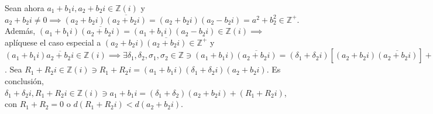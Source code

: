 \begin{teorema}[3F]
\begin{dem}
        Sean ahora $a_1+b_1i,a_2+b_2i\in\mathbb{Z}(i)$ y $a_2+b_2i\neq 0\implies (a_2+b_2i)\overline{(a_2+b_2i)}=(a_2+b_2i)(a_2-b_2i)=a^2+b_2^2\in\mathbb{Z}^+$. Además, $(a_1+b_1i)\overline{(a_2+b_2i)}= (a_1+b_1i)(a_2-b_2i)\in\mathbb{Z}(i)\implies$ aplíquese el caso especial a $(a_2+b_2i)\overline{(a_2+b_2i)}\in\mathbb{Z}^+$ y $(a_1+b_1i)\overline{a_2+b_2i}\in\mathbb{Z}(i)\implies \exists \delta_1,\delta_2,\sigma_1,\sigma_2\in\mathbb{Z}\ni (a_1+b_1i)\overline{(a_2+b_2i)}=(\delta_1+\delta_2i)\left[(a_2+b_2i)\overline{(a_2+b_2i)}\right]+ (\sigma_1+\sigma_2i)\ni d(a_2+b_2i)d(\overline{(a_2+b_2i)})=d\left((a_2+b_2i)\overline{(a_2+b_2i)}\right)>d(\sigma_1+\sigma_2i)=d\left((a_1+b_1i)\overline{(a_2+b_2i)}-(\sigma_1+\sigma_2i)\left[(a_2+b_2i)\overline{(a_2+b_2i)}\right]\right)=d\left(\left[(a_1+b_1i)-(\sigma_1+\sigma_2i)(a_2+b_2i)\overline{(a_2+b_2i)}\right]\right) = d\left((a_1+b_1i)-(\delta_1+\delta_2i)(a_2+b_2i)\right)d\left(\overline{a_2+b_2i}\right)\implies d(a_2+b_2i)>d\left((a_1+b_1i)-(\delta_1+\delta_2i)(a_2+b_2i)\right)$. Sea $R_1+R_2i\in \mathbb{Z}(i)\ni R_1+R_2i=(a_1+b_1i)(\delta_1+\delta_2i)(a_2+b_2i)$. Es conclusión, $\delta_1+\delta_2i, R_1+R_2i\in\mathbb{Z}(i)\ni a_1+b_1i=(\delta_1+\delta_2)(a_2+b_2i)+(R_1+R_2i)$, con $R_1+R_2=0$ o $d(R_1+R_2i)<d(a_2+ b_2i)$.
        \end{dem}  
\end{teorema}
